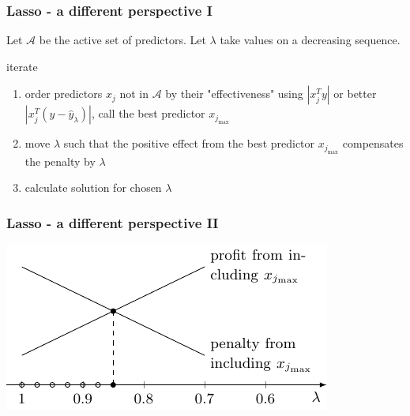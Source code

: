 \documentclass{beamer}
\newcommand{\norm}[1]{\left\lvert#1\right\rvert}
\begin{document}
\begin{frame}
\frametitle{Lasso - a different perspective I}
Let $\mathcal{A}$ be the active set of predictors. Let $\lambda$ take values on a decreasing sequence.

\vspace{15pt}

iterate

\begin{enumerate}
	\item order predictors $x_j$ not in $\mathcal{A}$ by their "effectiveness" using $\norm{x_j^Ty}$ or better $\norm{x_j^T(y-\hat{y}_{\lambda})}$, call the best predictor $x_{j_{\max}}$
	\item move $\lambda$ such that the positive effect from the best predictor $x_{j_{\max}}$ compensates the penalty by $\lambda$
	\item calculate solution for chosen $\lambda$
\end{enumerate}

\end{frame}


\begin{frame}
\frametitle{Lasso - a different perspective II}

\includegraphics[width=\linewidth]{img/lassodifferentperspective.pdf}

\end{frame}
\end{document}
